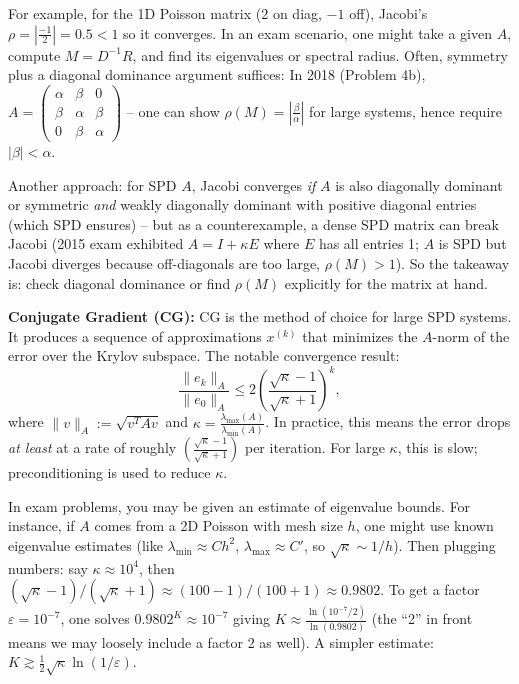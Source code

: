 \documentclass[a4paper,11pt]{article}
\begin{document}
For example, for the 1D Poisson matrix ($2$ on diag, $-1$ off), Jacobi's $\rho = |\frac{-1}{2}| = 0.5 < 1$ so it converges. In an exam scenario, one might take a given $A$, compute $M = D^{-1}R$, and find its eigenvalues or spectral radius. Often, symmetry plus a diagonal dominance argument suffices: In 2018 (Problem 4b), $A=\begin{pmatrix}\alpha & \beta &0\\ \beta&\alpha&\beta\\0&\beta&\alpha\end{pmatrix}$ -- one can show $\rho(M)=|\frac{\beta}{\alpha}|$ for large systems, hence require $|\beta|<\alpha$.

Another approach: for SPD $A$, Jacobi converges \textit{if} $A$ is also diagonally dominant or symmetric \textit{and} weakly diagonally dominant with positive diagonal entries (which SPD ensures) -- but as a counterexample, a dense SPD matrix can break Jacobi (2015 exam exhibited $A=I+\kappa E$ where $E$ has all entries 1; $A$ is SPD but Jacobi diverges because off-diagonals are too large, $\rho(M)>1$). So the takeaway is: check diagonal dominance or find $\rho(M)$ explicitly for the matrix at hand.

\textbf{Conjugate Gradient (CG):} CG is the method of choice for large SPD systems. It produces a sequence of approximations $x^{(k)}$ that minimizes the $A$-norm of the error over the Krylov subspace. The notable convergence result:
\[ \frac{\|e_{k}\|_A}{\|e_0\|_A} \le 2\left(\frac{\sqrt{\kappa}-1}{\sqrt{\kappa}+1}\right)^k, \]
where $\|v\|_A := \sqrt{v^T A v}$ and $\kappa = \frac{\lambda_{\max}(A)}{\lambda_{\min}(A)}$. In practice, this means the error drops \textit{at least} at a rate of roughly $\left(\frac{\sqrt{\kappa}-1}{\sqrt{\kappa}+1}\right)$ per iteration. For large $\kappa$, this is slow; preconditioning is used to reduce $\kappa$.

In exam problems, you may be given an estimate of eigenvalue bounds. For instance, if $A$ comes from a 2D Poisson with mesh size $h$, one might use known eigenvalue estimates (like $\lambda_{\min}\approx C h^2$, $\lambda_{\max}\approx C'$, so $\sqrt{\kappa}\sim 1/h$). Then plugging numbers: say $\kappa \approx 10^4$, then $(\sqrt{\kappa}-1)/(\sqrt{\kappa}+1)\approx (100-1)/(100+1)\approx 0.9802$. To get a factor $\varepsilon=10^{-7}$, one solves $0.9802^K \approx 10^{-7}$ giving $K \approx \frac{\ln(10^{-7}/2)}{\ln(0.9802)}$ (the ``2'' in front means we may loosely include a factor 2 as well). A simpler estimate: $K \gtrsim \frac{1}{2}\sqrt{\kappa}\ln(1/\varepsilon)$.
\end{document}
